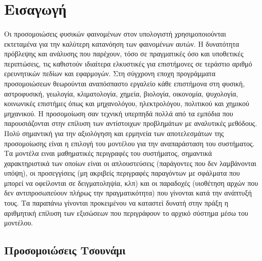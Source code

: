 \section{Εισαγωγή}

\paragraph{} Οι προσομοιώσεις φυσικών φαινομένων στον υπολογιστή χρησιμοποιούνται
εκτεταμένα για την καλύτερη κατανόηση των φαινομένων αυτών. Η δυνατότητα πρόβλεψης και
ανάλυσης που παρέχουν, τόσο σε πραγματικές όσο και υποθετικές περιπτώσεις, τις καθιστούν
ιδιαίτερα ελκυστικές για επιστήμονες σε τεράστιο αριθμό ερευνητικών πεδίων και
εφαρμογών. Στη σύγχρονη εποχη προγράμματα προσομοιώσεων θεωρούνται αναπόσπαστο εργαλείο
κάθε επιστήμονα στη φυσική, αστροφυσική, γεωλογία, κλιματολογία, χημεία, βιολογία,
οικονομία, ψυχολογία, κοινωνικές επιστήμες όπως και μηχανολόγου, ηλεκτρολόγου, πολιτικού
και χημικού μηχανικού. Η προσομοίωση σαν τεχνική υπερπηδά πολλά από τα εμπόδια που
παρουσιάζονται στην επίλυση των αντίστοιχων προβλημάτων με αναλυτικές μεθόδους. Πολύ
σημαντική για την αξιολόγηση και ερμηνεία των αποτελεσμάτων της προσομοίωσης είναι η
επιλογή του μοντέλου για την αναπαράσταση του συστήματος. Τα μοντέλα ειναι μαθηματικές
περιγραφές του συστήματος, σημαντικά χαρακτηριστικά των οποίων είναι οι απλουστεύσεις
(παράγοντες που δεν λαμβάνονται υπόψη), οι προσεγγίσεις (μη ακριβείς περιγραφές παραγόντων
με σφάλματα που μπορεί να οφείλονται σε δειγματοληψία, κλπ) και οι παραδοχές (υιοθέτηση
αρχών που δεν αντιπροσωπεύουν πλήρως την πραγματικότητα) που γίνονται κατά την ανάπτυξή
τους. Τα παραπάνω γίνονται προκειμένου να καταστεί δυνατή στην πράξη η αριθμητική επίλυση
των εξισώσεων που περιγράφουν το αρχικό σύστημα μέσω του μοντέλου.

\subsection{Προσομοιώσεις Τσουνάμι}
